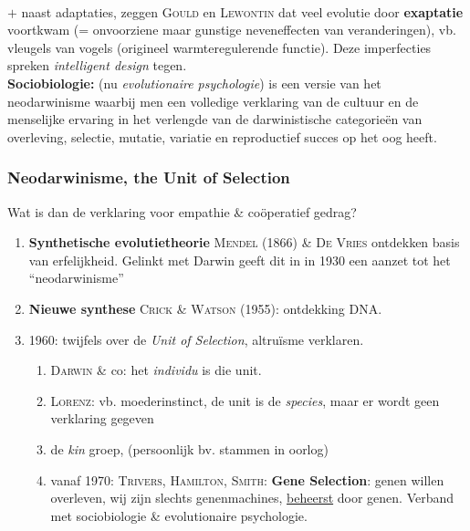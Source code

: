 \documentclass[11pt,a4paper]{article}
\begin{document}
\\
$+$ naast adaptaties, zeggen \textsc{Gould} en \textsc{Lewontin} dat veel evolutie door \textbf{exaptatie} voortkwam (= onvoorziene maar gunstige neveneffecten van veranderingen), vb. vleugels van vogels (origineel warmteregulerende functie). Deze imperfecties spreken \emph{intelligent design} tegen.
\\ \textbf{Sociobiologie:} (nu \textit{evolutionaire psychologie}) is een versie van het neodarwinisme waarbij men een volledige verklaring van de cultuur en de menselijke ervaring in het verlengde van de darwinistische categorie\"en van overleving, selectie, mutatie, variatie en reproductief succes op het oog heeft.

\subsubsection*{Neodarwinisme, the Unit of Selection}
Wat is dan de verklaring voor empathie \& co\"operatief gedrag? 

\begin{enumerate}
\item \textbf{Synthetische evolutietheorie} \textsc{Mendel} (1866) \& \textsc{De Vries} ontdekken basis van erfelijkheid. Gelinkt met Darwin geeft dit in in 1930 een aanzet tot het ``neodarwinisme''
\item \textbf{Nieuwe synthese} \textsc{Crick \& Watson} (1955): ontdekking DNA.
\item 1960: twijfels over de \emph{Unit of Selection}, altru\"isme verklaren.
	\begin{enumerate}
	\item \textsc{Darwin} \& co: het \emph{individu} is die unit.
	\item \textsc{Lorenz}: vb. moederinstinct, de unit is de \emph{species}, maar er wordt geen verklaring gegeven
	\item de \emph{kin} groep, (persoonlijk bv. stammen in oorlog)
	\item vanaf 1970: \textsc{Trivers}, \textsc{Hamilton}, \textsc{Smith}: \textbf{Gene Selection}: genen willen overleven, wij zijn slechts genenmachines, \underline{beheerst} door genen. Verband met sociobiologie \& evolutionaire psychologie.
	
	\end{enumerate}
\end{enumerate}
\end{document}
